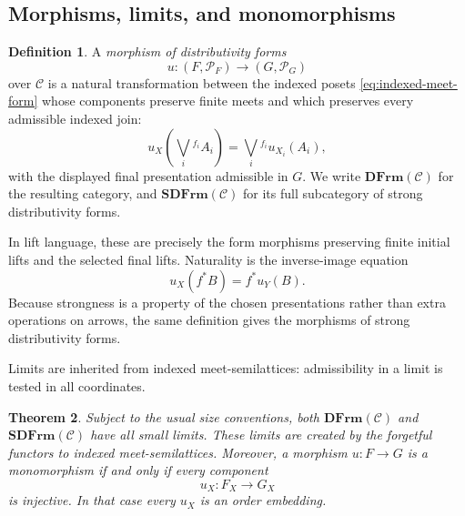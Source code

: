 \documentclass[12pt,oneside,reqno]{amsart}
\newtheorem{theorem}{Theorem}[section]
\theoremstyle{definition}
\newtheorem{definition}[theorem]{Definition}
\theoremstyle{remark}
\newcommand{\C}{\mathcal C}
\newcommand{\DFrm}{\mathbf{DFrm}}
\newcommand{\SDFrm}{\mathbf{SDFrm}}
\begin{document}
\subsection{Morphisms, limits, and monomorphisms}

\begin{definition}\label{def:distributivity-morphism}
A \emph{morphism of distributivity forms}
\[
             u:(F,\mathcal P_F)\longrightarrow(G,\mathcal P_G)
\]
over \(\C\) is a natural transformation between the indexed posets
\eqref{eq:indexed-meet-form} whose components preserve finite meets and
which preserves every admissible indexed join:
\[
 u_X\!\left(\bigvee_i{}^{f_i}A_i\right)
       =\bigvee_i{}^{f_i}u_{X_i}(A_i),
\]
with the displayed final presentation admissible in \(G\).  We write
\(\DFrm(\C)\) for the resulting category, and \(\SDFrm(\C)\) for its
full subcategory of strong distributivity forms.
\end{definition}

In lift language, these are precisely the form morphisms preserving
finite initial lifts and the selected final lifts.  Naturality is the
inverse-image equation
\[
                     u_X(f^*B)=f^*u_Y(B).
\]
Because strongness is a property of the chosen presentations rather
than extra operations on arrows, the same definition gives the
morphisms of strong distributivity forms.

Limits are inherited from indexed meet-semilattices: admissibility in a
limit is tested in all coordinates.

\begin{theorem}\label{thm:limits-and-monomorphisms}
Subject to the usual size conventions, both \(\DFrm(\C)\) and
\(\SDFrm(\C)\) have all small limits.  These limits are created by the
forgetful functors to indexed meet-semilattices.  Moreover, a morphism
\(u:F\to G\) is a monomorphism if and only if every component
\[
                       u_X:F_X\longrightarrow G_X
\]
is injective.  In that case every \(u_X\) is an order embedding.
\end{theorem}
\end{document}
